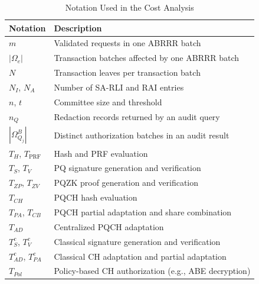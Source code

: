 \documentclass[lettersize,journal]{IEEEtran}
\begin{document}
\begin{table}[t]
\centering
\caption{Notation Used in the Cost Analysis}
\label{tab:cost-notation}
\scriptsize
\renewcommand{\arraystretch}{1.08}
\setlength{\tabcolsep}{3pt}
\begin{tabular}{ll}
\hline
\textbf{Notation} & \textbf{Description} \\
\hline
$m$ & Validated requests in one ABRRR batch \\
$|\Omega_e|$ & Transaction batches affected by one ABRRR batch \\
$N$ & Transaction leaves per transaction batch \\
$N_I$, $N_A$ & Number of SA-RLI and RAI entries \\
$n$, $t$ & Committee size and threshold \\
$n_Q$ & Redaction records returned by an audit query \\
$|\Omega_{Q_j}^B|$ & Distinct authorization batches in an audit result \\
\hline
$T_H$, $T_{\mathrm{PRF}}$ & Hash and PRF evaluation \\
$T_S$, $T_V$ & PQ signature generation and verification \\
$T_{ZP}$, $T_{ZV}$ & PQZK proof generation and verification \\
$T_{CH}$ & PQCH hash evaluation \\
$T_{PA}$, $T_{CB}$ & PQCH partial adaptation and share combination \\
$T_{AD}$ & Centralized PQCH adaptation \\
$T_S^{c}$, $T_V^{c}$ & Classical signature generation and verification \\
$T_{AD}^{c}$, $T_{PA}^{c}$ & Classical CH adaptation and partial adaptation \\
$T_{Pol}$ & Policy-based CH authorization (e.g., ABE decryption) \\
\hline
\end{tabular}
\end{table}
\end{document}
